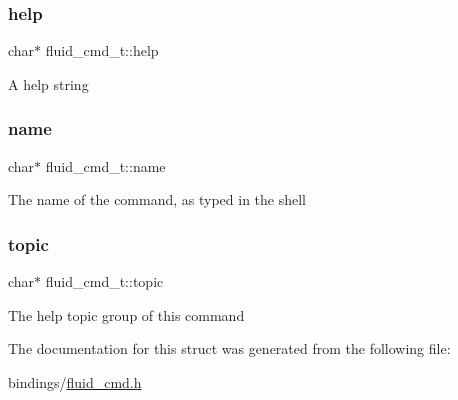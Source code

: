 \subsubsection{\texorpdfstring{help}{help}}
{\footnotesize\ttfamily char$\ast$ fluid\+\_\+cmd\+\_\+t\+::help}

A help string \mbox{\label{structfluid__cmd__t_a56b4e96adbae7d91c1d83cad7ca679c1}} 
\subsubsection{\texorpdfstring{name}{name}}
{\footnotesize\ttfamily char$\ast$ fluid\+\_\+cmd\+\_\+t\+::name}

The name of the command, as typed in the shell \mbox{\label{structfluid__cmd__t_ac78419632d74badd017050f3e41430b4}} 
\subsubsection{\texorpdfstring{topic}{topic}}
{\footnotesize\ttfamily char$\ast$ fluid\+\_\+cmd\+\_\+t\+::topic}

The help topic group of this command 

The documentation for this struct was generated from the following file\+:\begin{DoxyCompactItemize}
\item 
bindings/\hyperlink{fluid__cmd_8h}{fluid\+\_\+cmd.\+h}\end{DoxyCompactItemize}
